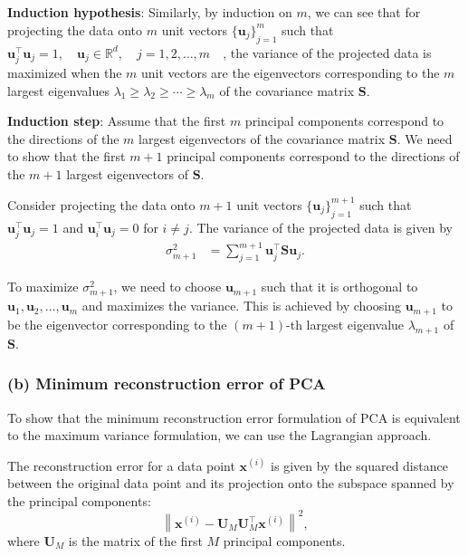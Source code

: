 \textbf{Induction hypothesis}:
Similarly, by induction on \( m \), we can see that for projecting the data onto \( m \) unit vectors \( {\{ \mathbf{u}_j \}}_{j=1}^{m} \) such that \( \mathbf{u}_j^\top \mathbf{u}_j = 1, \quad \mathbf{u}_j \in \mathbb{R}^d, \quad j = 1, 2, \dots, m \quad \), the variance of the projected data is maximized when the \( m \) unit vectors are the eigenvectors corresponding to the \( m \) largest eigenvalues \( \lambda_1 \geq \lambda_2 \geq \cdots \geq \lambda_m \) of the covariance matrix \( \mathbf{S} \).

\textbf{Induction step}:
Assume that the first \( m \) principal components correspond to the directions of the \( m \) largest eigenvectors of the covariance matrix \( \mathbf{S} \). We need to show that the first \( m+1 \) principal components correspond to the directions of the \( m+1 \) largest eigenvectors of \( \mathbf{S} \).

Consider projecting the data onto \( m+1 \) unit vectors \( {\{ \mathbf{u}_j \}}_{j=1}^{m+1} \) such that \( \mathbf{u}_j^\top \mathbf{u}_j = 1 \) and \( \mathbf{u}_i^\top \mathbf{u}_j = 0 \) for \( i \neq j \). The variance of the projected data is given by
\begin{align*}
    \sigma_{m+1}^2
     & =
    \sum_{j=1}^{m+1} \mathbf{u}_j^\top \mathbf{S} \mathbf{u}_j.
\end{align*}

To maximize \( \sigma_{m+1}^2 \), we need to choose \( \mathbf{u}_{m+1} \) such that it is orthogonal to \( \mathbf{u}_1, \mathbf{u}_2, \dots, \mathbf{u}_m \) and maximizes the variance. This is achieved by choosing \( \mathbf{u}_{m+1} \) to be the eigenvector corresponding to the \( (m+1) \)-th largest eigenvalue \( \lambda_{m+1} \) of \( \mathbf{S} \).

\clearpage
\subsubsection*{(b) Minimum reconstruction error of PCA}

To show that the minimum reconstruction error formulation of PCA is equivalent to the maximum variance formulation, we can use the Lagrangian approach.

The reconstruction error for a data point \( \mathbf{x}^{(i)} \) is given by the squared distance between the original data point and its projection onto the subspace spanned by the principal components:
\[
    \left\| \mathbf{x}^{(i)} - \mathbf{U}_M \mathbf{U}_M^\top \mathbf{x}^{(i)} \right\|^2,
\]
where \( \mathbf{U}_M \) is the matrix of the first \( M \) principal components.

